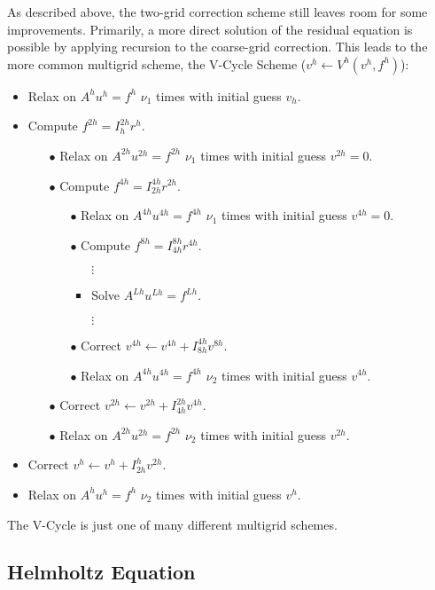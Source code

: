 \documentclass[]{article}
\begin{document}
As described above, the two-grid correction scheme still leaves room for some improvements.  Primarily, a more direct solution of the residual equation is possible by applying recursion to the coarse-grid correction.  This leads to the more common multigrid scheme, the V-Cycle Scheme ($v^h \leftarrow V^h (v^h, f^h)$):
\begin{itemize}
\item Relax on $A^h u^h = f^h$ $\nu_1$ times with initial guess $v_h$.
\item Compute $f^{2h} = I^{2h}_h r^h$.
	\begin{itemize}
	\item[$\bullet$] Relax on $A^{2h} u^{2h} = f^{2h}$ $\nu_1$ times with initial guess $v^{2h} = 0$.
	\item[$\bullet$] Compute $f^{4h} = I^{4h}_{2h} r^{2h}$.
		\begin{itemize}
		\item[$\bullet$] Relax on $A^{4h} u^{4h} = f^{4h}$ $\nu_1$ times with initial guess $v^{4h} = 0$.
		\item[$\bullet$] Compute $f^{8h} = I^{8h}_{4h} r^{4h}$.
			\begin{itemize}
				\item[$\vdots$]
				\item Solve $A^{Lh} u^{Lh} = f^{Lh}$.
				\item[$\vdots$]
			\end{itemize}
		\item[$\bullet$] Correct $v^{4h} \leftarrow v^{4h} + I^{4h}_{8h} v^{8h}$.
		\item[$\bullet$] Relax on $A^{4h} u^{4h} = f^{4h}$ $\nu_2$ times with initial guess $v^{4h}$.
		\end{itemize}
	\item[$\bullet$] Correct $v^{2h} \leftarrow v^{2h} + I^{2h}_{4h} v^{4h}$.
	\item[$\bullet$] Relax on $A^{2h} u^{2h} = f^{2h}$ $\nu_2$ times with initial guess $v^{2h}$.
	\end{itemize}
\item Correct $v^{h} \leftarrow v^{h} + I^{h}_{2h} v^{2h}$.
\item Relax on $A^{h} u^{h} = f^{h}$ $\nu_2$ times with initial guess $v^{h}$.
\end{itemize}

The V-Cycle is just one of many different multigrid schemes.

\subsection{Helmholtz Equation}
\end{document}
